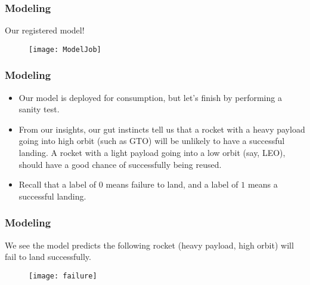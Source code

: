 \documentclass{beamer}
\begin{document}

\begin{frame}

\frametitle{Modeling}

Our registered model!

\begin{figure}
\texttt{[image: ModelJob]}
\end{figure}


\end{frame}



\begin{frame}

\frametitle{Modeling}

\begin{itemize}

\item Our model is deployed for consumption, but let's finish by performing a sanity test.

\bigskip

\item From our insights, our gut instincts tell us that a rocket with a heavy payload going into high orbit (such as GTO) will be unlikely to have a successful landing. A rocket with a light payload going into a low orbit (say, LEO), should have a good chance of successfully being reused.

\bigskip

\item Recall that a label of $0$ means failure to land, and a label of $1$ means a successful landing.

\end{itemize}

\end{frame}



\begin{frame}

\frametitle{Modeling}

We see the model predicts the following rocket (heavy payload, high orbit) will fail to land successfully.

\begin{figure}
\texttt{[image: failure]}
\end{figure}


\end{frame}


\end{document}
